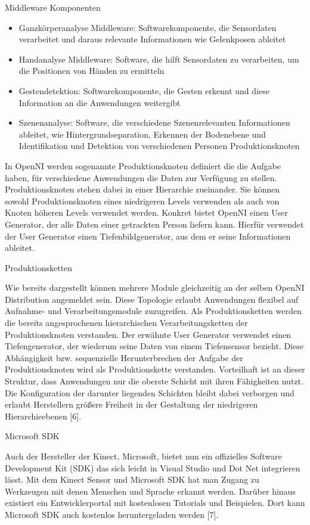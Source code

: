 Middleware Komponenten
\begin{itemize}
  \item Ganzkörperanalyse Middleware: Softwarekomponente, die Sensordaten verarbeitet und daraus relevante Informationen wie Gelenkposen ableitet
  \item Handanalyse Middleware: Software, die hilft Sensordaten zu verarbeiten, um die Positionen von Händen zu ermitteln
  \item Gestendetektion: Softwarekomponente, die Gesten erkennt und diese Information an die Anwendungen weitergibt
  \item Szenenanalyse: Software, die verschiedene Szenenrelevanten Informationen ableitet, wie Hintergrundseparation, Erkennen der Bodenebene und Identifikation und Detektion von verschiedenen Personen
Produktionsknoten
\end{itemize}

In OpenNI werden sogenannte Produktionsknoten definiert die die Aufgabe haben, für verschiedene Anwendungen die Daten zur Verfügung zu stellen. Produktionsknoten stehen dabei in einer Hierarchie zueinander. Sie können sowohl Produktionsknoten eines niedrigeren Levels verwenden als auch von Knoten höheren Levels verwendet werden. Konkret bietet OpenNI einen User Generator, der alle Daten einer getrackten Person liefern kann. Hierfür verwendet der User Generator einen Tiefenbildgenerator, aus dem er seine Informationen ableitet.

Produktionsketten

Wie bereits dargestellt können mehrere Module gleichzeitig an der selben OpenNI Distribution angemeldet sein. Diese Topologie erlaubt Anwendungen flexibel auf Aufnahme- und Verarbeitungsmodule zuzugreifen. Als Produktionsketten werden die bereits angesprochenen hierarchischen Verarbeitungsketten der Produktionsknoten verstanden. Der erwähnte User Generator verwendet einen Tiefengenerator, der wiederum seine Daten von einem Tiefensensor bezieht. Diese Abhängigkeit bzw. sequenzielle Herunterbrechen der Aufgabe der Produktionsknoten wird als Produktionskette verstanden. Vorteilhaft ist an dieser Struktur, dass Anwendungen nur die oberste Schicht mit ihren Fähigkeiten nutzt. Die Konfiguration der darunter liegenden Schichten bleibt dabei verborgen und erlaubt Herstellern größere Freiheit in der Gestaltung der niedrigeren Hierarchieebenen [6].

Microsoft SDK

Auch der Hersteller der Kinect, Microsoft, bietet nun ein offizielles Software Development Kit (SDK) das sich leicht in Visual Studio und Dot Net integrieren lässt. Mit dem Kinect Sensor und Microsoft SDK hat man Zugang zu Werkzeugen mit denen Menschen und Sprache erkannt werden. Darüber hinaus existiert ein Entwicklerportal mit kostenlosen Tutorials und Beispielen. Dort kann Microsoft SDK auch kostenlos heruntergeladen werden [7].

